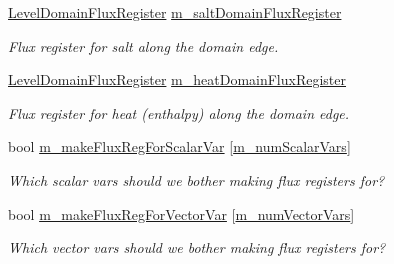 \begin{DoxyCompactItemize}
\hyperlink{class_level_domain_flux_register}{Level\+Domain\+Flux\+Register} \hyperlink{class_a_m_r_level_mushy_layer_a7f0dd62b216d0ab459d2f8469297c852}{m\+\_\+salt\+Domain\+Flux\+Register}
\begin{DoxyCompactList}\small\item\em Flux register for salt along the domain edge. \end{DoxyCompactList}\item 
\mbox{\label{class_a_m_r_level_mushy_layer_a12005aabbc909314eba74afaba3a9188}} 
\hyperlink{class_level_domain_flux_register}{Level\+Domain\+Flux\+Register} \hyperlink{class_a_m_r_level_mushy_layer_a12005aabbc909314eba74afaba3a9188}{m\+\_\+heat\+Domain\+Flux\+Register}
\begin{DoxyCompactList}\small\item\em Flux register for heat (enthalpy) along the domain edge. \end{DoxyCompactList}\item 
\mbox{\label{class_a_m_r_level_mushy_layer_a934fadf749cd979e03db2a084450ae73}} 
bool \hyperlink{class_a_m_r_level_mushy_layer_a934fadf749cd979e03db2a084450ae73}{m\+\_\+make\+Flux\+Reg\+For\+Scalar\+Var} \mbox{[}\hyperlink{mushy_layer_opt_8h_afcada9fb65a998951da882b5c10191fea83db32f5839575c9d7812f3cd0727d07}{m\+\_\+num\+Scalar\+Vars}\mbox{]}
\begin{DoxyCompactList}\small\item\em Which scalar vars should we bother making flux registers for? \end{DoxyCompactList}\item 
\mbox{\label{class_a_m_r_level_mushy_layer_adc0b73ca3269c4015bcc31850ab50785}} 
bool \hyperlink{class_a_m_r_level_mushy_layer_adc0b73ca3269c4015bcc31850ab50785}{m\+\_\+make\+Flux\+Reg\+For\+Vector\+Var} \mbox{[}\hyperlink{mushy_layer_opt_8h_ad67b5b87e24a070e739a68078dcb7520a0bc95e626dcdeae398d6bb728b28578f}{m\+\_\+num\+Vector\+Vars}\mbox{]}
\begin{DoxyCompactList}\small\item\em Which vector vars should we bother making flux registers for? \end{DoxyCompactList}\item 
\mbox{\label{class_a_m_r_level_mushy_layer_a3b035a45d271c4c771406dc0f181d44e}} 

\end{DoxyCompactItemize}
